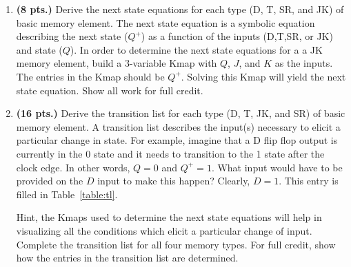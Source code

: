 \begin{enumerate}
        \begin{table}[ht]
        \end{table}

    \item \textbf{ (8 pts.)} Derive the next state equations for each
        type (D, T, SR, and JK) of basic memory element.  The next state equation
        is a symbolic equation describing the next state ($Q^+$)
        as a function of the inputs (D,T,SR, or JK) and state ($Q$).
        In order to determine the next state equations for a
        a JK memory element, build a 3-variable Kmap with
        $Q$, $J$, and $K$ as the inputs.  The entries in the Kmap should
        be $Q^+$.  Solving this Kmap will yield the next state equation.
        Show all work for full credit.

    \item \textbf{ (16 pts.)} Derive the transition list for each
        type (D, T, JK, and SR) of basic memory element.  A transition
        list describes the input(s) necessary to elicit a particular
        change in state.  For example, imagine that a D flip flop output
        is currently in the 0 state and it needs to transition to
        the 1 state after the clock edge.  In other words, $Q=0$ and
        $Q^+ = 1$.  What input would have to be provided on the
        $D$ input to make this happen?  Clearly, $D=1$.  This entry
        is filled in Table~\ref{table:tl}.

        Hint, the Kmaps used to determine the next state equations
        will help in visualizing all the conditions which elicit
        a particular change of input.  Complete the transition list
        for all four memory types.  For full credit, show how the
        entries in the transition list are determined.

        \begin{table}[ht]
\end{table}
\end{enumerate}
